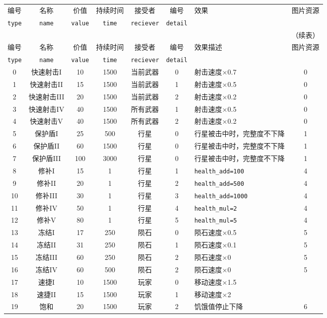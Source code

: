 \documentclass[UTF8,fontset=none,linespread=1.2]{ctexart}
\begin{document}
\begin{center}
\begin{longtable}{|c|c|c|c|c|c|>{\centering\arraybackslash}m{6cm}|c|}
\hline
编号&名称&价值&持续时间&接受者&编号&效果&图片资源\\
\lstinline|type|&\lstinline|name|&\lstinline|value|&\lstinline|time|&\lstinline|reciever|&\lstinline|detail|&&\\\hline
\endfirsthead
\multicolumn{8}{r}{（续表）}\\\hline
编号&名称&价值&持续时间&接受者&编号&效果描述&图片资源\\
\lstinline|type|&\lstinline|name|&\lstinline|value|&\lstinline|time|&\lstinline|reciever|&\lstinline|detail|&&\\\hline
\endhead
0&快速射击I&10&1500&当前武器&0&射击速度×0.7&0\\\hline
1&快速射击II&15&1500&当前武器&1&射击速度×0.5&0\\\hline
2&快速射击III&20&1500&当前武器&2&射击速度×0.2&0\\\hline
3&快速射击IV&40&1500&所有武器&1&射击速度×0.5&0\\\hline
4&快速射击V&40&1500&所有武器&2&射击速度×0.2&0\\\hline
5&保护盾I&25&500&行星&0&行星被击中时，完整度不下降&1\\\hline
6&保护盾II&60&1500&行星&0&行星被击中时，完整度不下降&1\\\hline
7&保护盾III&100&3000&行星&0&行星被击中时，完整度不下降&1\\\hline
8&修补I&15&1&行星&1&\lstinline|health_add=100|&4\\\hline
9&修补II&20&1&行星&2&\lstinline|health_add=500|&4\\\hline
10&修补III&30&1&行星&3&\lstinline|health_add=1000|&4\\\hline
11&修补IV&50&1&行星&4&\lstinline|health_mul=2|&4\\\hline
12&修补V&80&1&行星&5&\lstinline|health_mul=5|&4\\\hline
13&冻结I&17&250&陨石&0&陨石速度×0.5&5\\\hline
14&冻结II&31&250&陨石&1&陨石速度×0.1&5\\\hline
15&冻结III&60&250&陨石&2&陨石速度×0&5\\\hline
16&冻结IV&60&500&陨石&2&陨石速度×0&5\\\hline
17&速捷I&10&1500&玩家&0&移动速度×1.5&\\\hline
18&速捷II&15&1500&玩家&1&移动速度×2&\\\hline
19&饱和&20&1500&玩家&2&饥饿值停止下降&6\\\hline

\end{longtable}
\end{center}
\end{document}
